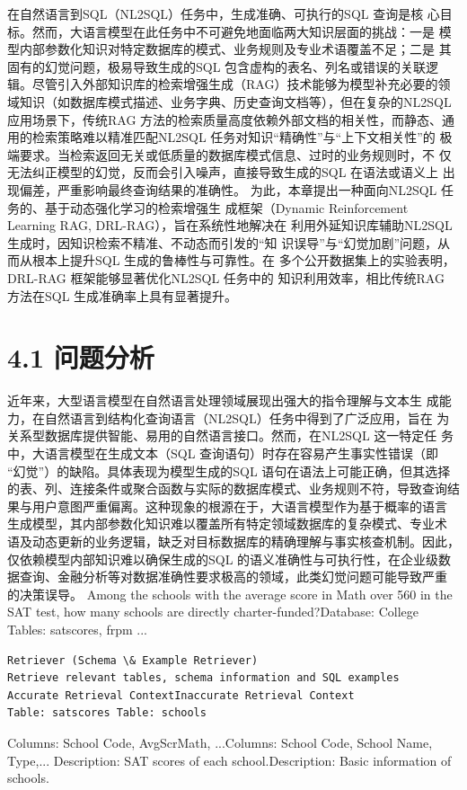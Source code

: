 \documentclass[12pt,a4paper,openright,UTF8]{ctexbook}
\begin{document}
在自然语言到SQL（NL2SQL）任务中，生成准确、可执行的SQL 查询是核 心目标。然而，大语言模型在此任务中不可避免地面临两大知识层面的挑战：一是 模型内部参数化知识对特定数据库的模式、业务规则及专业术语覆盖不足；二是 其固有的幻觉问题，极易导致生成的SQL 包含虚构的表名、列名或错误的关联逻 辑。尽管引入外部知识库的检索增强生成（RAG）技术能够为模型补充必要的领 域知识（如数据库模式描述、业务字典、历史查询文档等），但在复杂的NL2SQL 应用场景下，传统RAG 方法的检索质量高度依赖外部文档的相关性，而静态、通 用的检索策略难以精准匹配NL2SQL 任务对知识“精确性”与“上下文相关性”的 极端要求。当检索返回无关或低质量的数据库模式信息、过时的业务规则时，不 仅无法纠正模型的幻觉，反而会引入噪声，直接导致生成的SQL 在语法或语义上 出现偏差，严重影响最终查询结果的准确性。 为此，本章提出一种面向NL2SQL 任务的、基于动态强化学习的检索增强生 成框架（Dynamic Reinforcement Learning RAG, DRL-RAG），旨在系统性地解决在 利用外延知识库辅助NL2SQL 生成时，因知识检索不精准、不动态而引发的“知 识误导”与“幻觉加剧”问题，从而从根本上提升SQL 生成的鲁棒性与可靠性。在 多个公开数据集上的实验表明，DRL-RAG 框架能够显著优化NL2SQL 任务中的 知识利用效率，相比传统RAG 方法在SQL 生成准确率上具有显著提升。

\section{4.1 问题分析}

近年来，大型语言模型在自然语言处理领域展现出强大的指令理解与文本生 成能力，在自然语言到结构化查询语言（NL2SQL）任务中得到了广泛应用，旨在 为关系型数据库提供智能、易用的自然语言接口。然而，在NL2SQL 这一特定任 务中，大语言模型在生成文本（SQL 查询语句）时存在容易产生事实性错误（即 “幻觉”）的缺陷。具体表现为模型生成的SQL 语句在语法上可能正确，但其选择 的表、列、连接条件或聚合函数与实际的数据库模式、业务规则不符，导致查询结 果与用户意图严重偏离。这种现象的根源在于，大语言模型作为基于概率的语言 生成模型，其内部参数化知识难以覆盖所有特定领域数据库的复杂模式、专业术 语及动态更新的业务逻辑，缺乏对目标数据库的精确理解与事实核查机制。因此， 仅依赖模型内部知识难以确保生成的SQL 的语义准确性与可执行性，在企业级数 据查询、金融分析等对数据准确性要求极高的领域，此类幻觉问题可能导致严重 的决策误导。 Among the schools with the average score in Math over 560 in the SAT test, how many schools are directly charter-funded?Database: College Tables: satscores, frpm ...

\begin{lstlisting}
Retriever (Schema \& Example Retriever)
Retrieve relevant tables, schema information and SQL examples
Accurate Retrieval ContextInaccurate Retrieval Context
Table: satscores Table: schools
\end{lstlisting}
Columns: School Code, AvgScrMath, ...Columns: School Code, School Name, Type,... Description: SAT scores of each school.Description: Basic information of schools.
\end{document}
